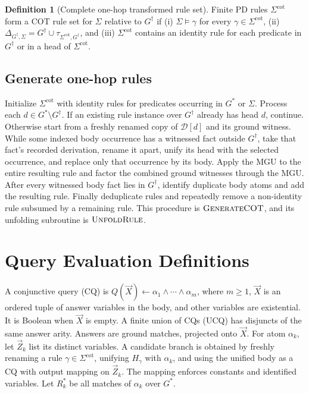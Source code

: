 \documentclass[conference]{IEEEtran}
\theoremstyle{definition}
\newtheorem{definition}{Definition}
\newcommand{\vect}[1]{\vec{#1}}
\newcommand{\Gc}{G^{\dagger}}
\newcommand{\Sig}{\Sigma}
\newcommand{\Sigcot}{\Sig^{\mathrm{cot}}}
\newcommand{\Der}{\mathcal{D}}
\newcommand{\COT}{\textsc{COT}}
\newcommand{\FunctionName}[1]{\textsc{#1}}
\begin{document}
\begin{definition}[Complete one-hop transformed rule set]
\label{def:cot}
Finite PD rules $\Sigcot$ form a \COT{} rule set for $\Sig$ relative
to $\Gc$ if (i) $\Sig\models\gamma$ for every
$\gamma\in\Sigcot$, (ii)
$\Delta_{\Gc,\Sig}=\Gc\cup\tau_{\Sigcot,\Gc}$, and
(iii) $\Sigcot$ contains an identity rule for each predicate in
$\Gc$ or in a head of $\Sigcot$.
\end{definition}

\subsection{Generate one-hop rules}
\label{alg:gencot}
Initialize $\Sigcot$ with identity rules for predicates occurring in
$G^{*}$ or $\Sig$. Process each $d\in G^{*}\setminus\Gc$. If an
existing rule instance over $\Gc$ already has head $d$, continue.
Otherwise start from a freshly renamed copy of $\Der[d]$ and its
ground witness. While some indexed body occurrence has a witnessed
fact outside $\Gc$, take that fact's recorded derivation, rename it
apart, unify its head with the selected occurrence, and replace only
that occurrence by its body. Apply the MGU to the entire resulting
rule and factor the combined ground witnesses through the MGU.
After every witnessed body fact lies in $\Gc$, identify duplicate
body atoms and add the resulting rule. Finally deduplicate rules and
repeatedly remove a non-identity rule subsumed by a remaining rule.
This procedure is $\FunctionName{GenerateCOT}$, and its unfolding
subroutine is $\FunctionName{UnfoldRule}$.

\section{Query Evaluation Definitions}
\label{sec:sqlcomposition}
A conjunctive query (CQ) is
$Q(\vect{X})\leftarrow\alpha_1\wedge\cdots\wedge\alpha_m$, where
$m\geq1$, $\vect{X}$ is an ordered tuple of answer variables in the
body, and other variables are existential. It is Boolean when
$\vect{X}$ is empty. A finite union of CQs (UCQ) has disjuncts of
the same answer arity. Answers are ground matches, projected onto
$\vect{X}$. For atom $\alpha_k$, let $\vect{Z}_k$ list its distinct
variables. A candidate branch is obtained by freshly renaming a
rule $\gamma\in\Sigcot$, unifying $H_\gamma$ with $\alpha_k$, and
using the unified body as a CQ with output mapping on $\vect{Z}_k$.
The mapping enforces constants and identified variables. Let
$R_k^{*}$ be all matches of $\alpha_k$ over $G^{*}$.
\end{document}
